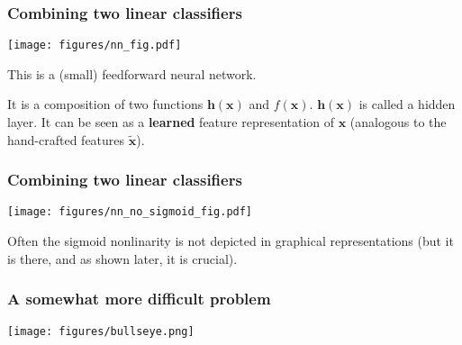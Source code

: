 \documentclass[notes]{beamer}          %
\begin{document}
\begin{frame}
\frametitle{Combining two linear classifiers}
\begin{center}
\texttt{[image: figures/nn\_fig.pdf]} \\
\end{center}
\pause
\begin{center}
This is a (small) feedforward neural network. 
\end{center}
\pause

It is a composition of two functions $\mathbf{h}(\mathbf{x})$ and $f(\mathbf{x})$.  $\mathbf{h}(\mathbf{x})$ is called a hidden layer. It can be seen as a \textbf{learned} feature representation of $\mathbf{x}$ (analogous to the hand-crafted features $\mathbf{\tilde x} $).

\end{frame}


\begin{frame}
\frametitle{Combining two linear classifiers}
\begin{center}
\texttt{[image: figures/nn\_no\_sigmoid\_fig.pdf]} \\
\end{center}
Often the sigmoid nonlinarity is not depicted in graphical representations (but it is there, and as shown later, it is crucial). 

\end{frame}

\begin{frame}
\frametitle{A somewhat more difficult problem}
\begin{center}
\texttt{[image: figures/bullseye.png]} \\
\end{center}
\end{frame}

\begin{comment}

\begin{frame}
\frametitle{A somewhat more difficult problem}
\begin{center}
\texttt{[image: figures/bullseye.png]} \\
\end{center}
\begin{center}
\href{http://bit.ly/393Wf4I}{Example} in Tensorflow Playground.
\end{center}
\end{frame}

\end{comment}
\end{document}
